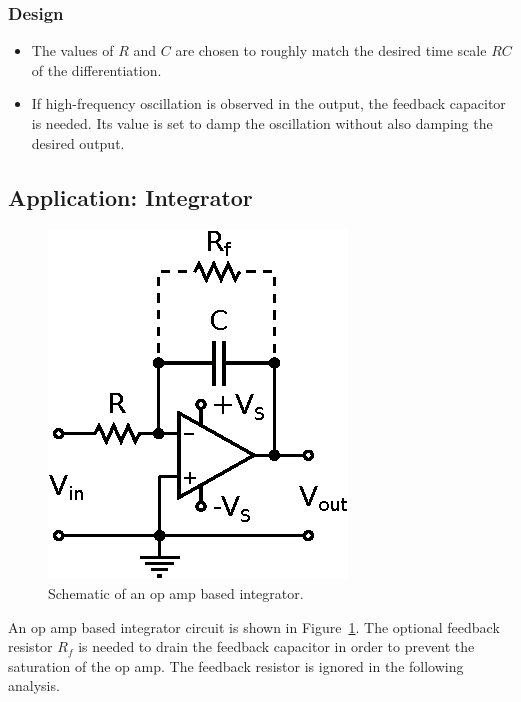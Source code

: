 \documentclass[11pt]{article}
\begin{document}
\subsubsection*{Design}
\begin{itemize}
\item The values of $R$ and $C$ are chosen to roughly match the
  desired time scale $RC$ of the differentiation. 

\item If high-frequency oscillation is observed in the output, the
  feedback capacitor is needed. Its value is set to damp the
  oscillation without also damping the desired output.
  
\end{itemize}

\subsection{Application: Integrator}
\label{sec:integrator}

\begin{figure}[h!]
  \begin{center}
    \includegraphics{integrator.eps}
    \caption{Schematic of an op amp based integrator.}
    \label{fig:integrator}
  \end{center}
\end{figure}

An op amp based integrator circuit is shown in
Figure~\ref{fig:integrator}. The optional feedback resistor $R_f$ is
needed to drain the feedback capacitor in order to prevent the
saturation of the op amp. The feedback resistor is ignored in the 
following analysis.
\end{document}
